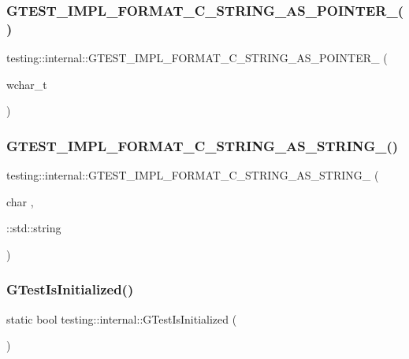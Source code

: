 \subsubsection{\texorpdfstring{GTEST\_IMPL\_FORMAT\_C\_STRING\_AS\_POINTER\_()}{GTEST\_IMPL\_FORMAT\_C\_STRING\_AS\_POINTER\_()}\hspace{0.1cm}{\footnotesize\ttfamily [2/2]}}
{\footnotesize\ttfamily testing\+::internal\+::\+G\+T\+E\+S\+T\+\_\+\+I\+M\+P\+L\+\_\+\+F\+O\+R\+M\+A\+T\+\_\+\+C\+\_\+\+S\+T\+R\+I\+N\+G\+\_\+\+A\+S\+\_\+\+P\+O\+I\+N\+T\+E\+R\+\_\+ (\begin{DoxyParamCaption}\item[{wchar\+\_\+t}]{ }\end{DoxyParamCaption})}

\mbox{\label{namespacetesting_1_1internal_aeac30230dcc362221bdd07d61eaa4ec1}} 
\subsubsection{\texorpdfstring{GTEST\_IMPL\_FORMAT\_C\_STRING\_AS\_STRING\_()}{GTEST\_IMPL\_FORMAT\_C\_STRING\_AS\_STRING\_()}}
{\footnotesize\ttfamily testing\+::internal\+::\+G\+T\+E\+S\+T\+\_\+\+I\+M\+P\+L\+\_\+\+F\+O\+R\+M\+A\+T\+\_\+\+C\+\_\+\+S\+T\+R\+I\+N\+G\+\_\+\+A\+S\+\_\+\+S\+T\+R\+I\+N\+G\+\_\+ (\begin{DoxyParamCaption}\item[{char}]{,  }\item[{\+::std\+::string}]{ }\end{DoxyParamCaption})}

\mbox{\label{namespacetesting_1_1internal_a91e707e0d371fae0224ffd37f0d042af}} 
\subsubsection{\texorpdfstring{GTestIsInitialized()}{GTestIsInitialized()}}
{\footnotesize\ttfamily static bool testing\+::internal\+::\+G\+Test\+Is\+Initialized (\begin{DoxyParamCaption}{ }\end{DoxyParamCaption})\hspace{0.3cm}{\ttfamily [static]}}

